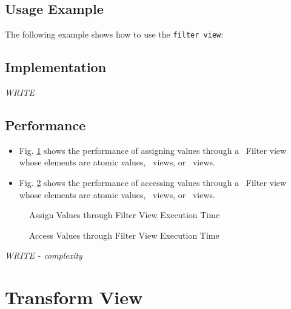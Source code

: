 \subsection{Usage Example} \label{sec-filt-vw-use}

The following example shows how to use the \texttt{filter view}:


\subsection{Implementation} \label{sec-filt-vw-impl}

\textit{WRITE}

\subsection{Performance} \label{sec-filt-vw-perf}

\begin{itemize}
\item
Fig. \ref{fig:filt-vw-assign-exper}
shows the performance of assigning values through a \stapl\ Filter view
whose elements are atomic values, \stl\ views, or \stapl\ views.
\item
Fig. \ref{fig:filt-vw-access-exper}
shows the performance of accessing values through a \stapl\ Filter view
whose elements are atomic values, \stl\ views, or \stapl\ views.
\end{itemize}

\begin{figure}[p]
\caption{Assign Values through Filter View Execution Time}
\label{fig:filt-vw-assign-exper}
\end{figure}

\begin{figure}[p]
\caption{Access Values through Filter View Execution Time}
\label{fig:filt-vw-access-exper}
\end{figure}

\emph{WRITE - complexity}


\section{Transform View} \label{sec-trans-vw}

